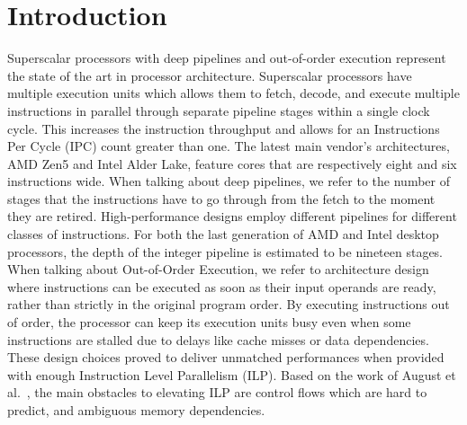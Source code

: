 \section{Introduction}
Superscalar processors with deep pipelines and out-of-order execution represent the state of the art in processor architecture. Superscalar processors have multiple execution units which allows them to fetch, decode, and execute multiple instructions in parallel through separate pipeline stages within a single clock cycle. This increases the instruction throughput and allows for an Instructions Per Cycle (IPC) count greater than one. The latest main vendor's architectures, AMD Zen5 and Intel Alder Lake, feature cores that are respectively eight and six instructions wide. When talking about deep pipelines, we refer to the number of stages that the instructions have to go through from the fetch to the moment they are retired. High-performance designs employ different pipelines for different classes of instructions. For both the last generation of AMD and Intel desktop processors, the depth of the integer pipeline is estimated to be nineteen stages. When talking about Out-of-Order Execution, we refer to architecture design where instructions can be executed as soon as their input operands are ready, rather than strictly in the original program order. By executing instructions out of order, the processor can keep its execution units busy even when some instructions are stalled due to delays like cache misses or data dependencies. These design choices proved to deliver unmatched performances when provided with enough Instruction Level Parallelism (ILP). Based on the work of August et al.~\cite{August98}, the main obstacles to elevating ILP are control flows which are hard to predict, and ambiguous memory dependencies. 

